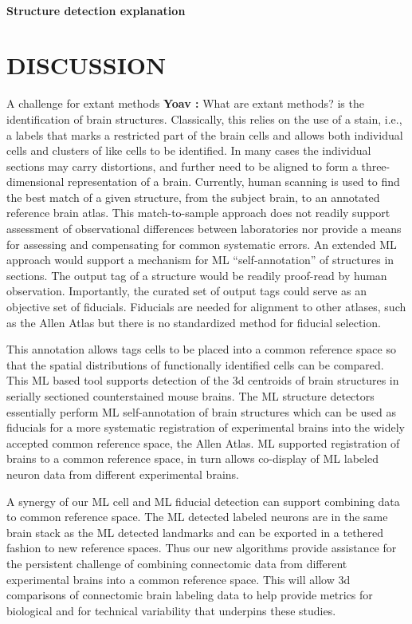 \documentclass[11pt]{article}
\newcommand{\comment}[3]{{\color{#1} {\bf #2 :} #3}}
\newcommand{\yoav}[1]{\comment{purple}{Yoav}{#1}}
\begin{document}
\paragraph{ Structure detection explanation}

\section{DISCUSSION}

A challenge for extant methods \yoav{What are extant methods?} is the identification of brain structures. Classically, this relies on the use of a stain, i.e., a labels that marks a restricted part of the brain cells and allows both individual cells and clusters of like cells to be identified. In many cases the individual sections may carry distortions, and further need to be aligned to form a three-dimensional representation of a brain. Currently, human scanning is used to find the best match of a given structure, from the subject brain, to an annotated reference brain atlas. This match-to-sample approach does not readily support assessment of observational differences between laboratories nor provide a means for assessing and compensating for common systematic errors. An extended ML approach would support a mechanism for ML “self-annotation” of structures in sections. The output tag of a structure would be readily proof-read by human observation. Importantly, the curated set of output tags could serve as an objective set of fiducials. Fiducials are needed for alignment to other atlases, such as the Allen Atlas but there is no standardized method for fiducial selection.

This annotation allows tags cells to be placed into a common reference space so that the spatial distributions of functionally identified cells can be compared. This ML based tool supports detection of the 3d centroids of brain structures in serially sectioned counterstained mouse brains. The ML structure detectors essentially perform ML self-annotation of brain structures which can be used as fiducials for a more systematic registration of experimental brains into the widely accepted common reference space, the Allen Atlas. ML supported registration of brains to a common reference space, in turn allows co-display of ML labeled neuron data from different experimental brains.

A synergy of our ML cell and ML fiducial detection can support combining data  to common reference space. The ML detected labeled neurons are in the same brain stack as the ML detected landmarks and can be exported in a tethered fashion to new reference spaces. Thus our new algorithms provide assistance for the persistent challenge of combining connectomic data from different experimental brains into a common reference space. This will allow 3d comparisons of connectomic brain labeling data to help provide metrics for biological and for technical variability that underpins these studies. 
\end{document}
